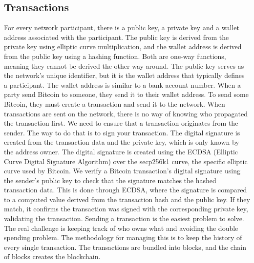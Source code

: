 \subsection{Transactions}
For every network participant, there is a public key, a private key and a wallet address associated with the participant.
The public key is derived from the private key using elliptic curve multiplication, and the wallet address is derived from the public key using a hashing function. \cite{MB17}
Both are one-way functions, meaning they cannot be derived the other way around.
The public key serves as the network's unique identifier, but it is the wallet address that typically defines a participant.
The wallet address is similar to a bank account number. When a party send Bitcoin to someone, they send it to their wallet address.
To send some Bitcoin, they must create a transaction and send it to the network.
When transactions are sent on the network, there is no way of knowing who propagated the transaction first.
We need to ensure that a transaction originates from the sender. The way to do that is to sign your transaction. The digital signature is created from the transaction data and the private key, which is only known by the address owner.
The digital signature is created using the ECDSA (Elliptic Curve Digital Signature Algorithm) over the secp256k1 curve, the specific elliptic curve used by Bitcoin.
We verify a Bitcoin transaction's digital signature using the sender's public key to check that the signature matches the hashed transaction data.
This is done through ECDSA, where the signature is compared to a computed value derived from the transaction hash and the public key.
If they match, it confirms the transaction was signed with the corresponding private key, validating the transaction.
Sending a transaction is the easiest problem to solve. The real challenge is keeping track of who owns what and avoiding the double spending problem.
The methodology for managing this is to keep the history of every single transaction. The transactions are bundled into blocks, and the chain of blocks creates the blockchain.

